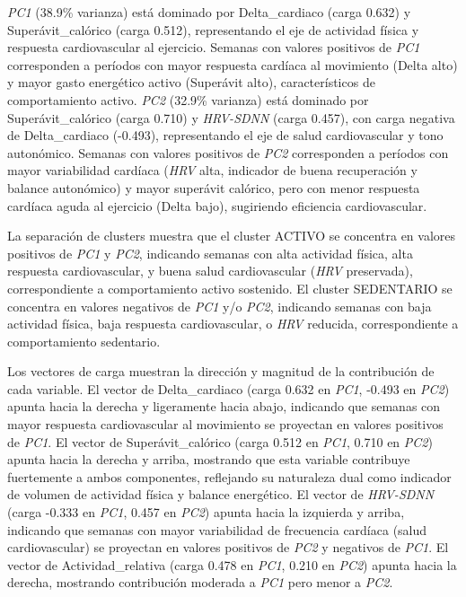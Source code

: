 \textit{PC1} (38.9\% varianza) está dominado por Delta\_cardiaco (carga 0.632) y Superávit\_calórico (carga 0.512), representando el eje de actividad física y respuesta cardiovascular al ejercicio. Semanas con valores positivos de \textit{PC1} corresponden a períodos con mayor respuesta cardíaca al movimiento (Delta alto) y mayor gasto energético activo (Superávit alto), característicos de comportamiento activo. \textit{PC2} (32.9\% varianza) está dominado por Superávit\_calórico (carga 0.710) y \textit{HRV-SDNN} (carga 0.457), con carga negativa de Delta\_cardiaco (-0.493), representando el eje de salud cardiovascular y tono autonómico. Semanas con valores positivos de \textit{PC2} corresponden a períodos con mayor variabilidad cardíaca (\textit{HRV} alta, indicador de buena recuperación y balance autonómico) y mayor superávit calórico, pero con menor respuesta cardíaca aguda al ejercicio (Delta bajo), sugiriendo eficiencia cardiovascular.

La separación de clusters muestra que el cluster ACTIVO se concentra en valores positivos de \textit{PC1} y \textit{PC2}, indicando semanas con alta actividad física, alta respuesta cardiovascular, y buena salud cardiovascular (\textit{HRV} preservada), correspondiente a comportamiento activo sostenido. El cluster SEDENTARIO se concentra en valores negativos de \textit{PC1} y/o \textit{PC2}, indicando semanas con baja actividad física, baja respuesta cardiovascular, o \textit{HRV} reducida, correspondiente a comportamiento sedentario.

Los vectores de carga muestran la dirección y magnitud de la contribución de cada variable. El vector de Delta\_cardiaco (carga 0.632 en \textit{PC1}, -0.493 en \textit{PC2}) apunta hacia la derecha y ligeramente hacia abajo, indicando que semanas con mayor respuesta cardiovascular al movimiento se proyectan en valores positivos de \textit{PC1}. El vector de Superávit\_calórico (carga 0.512 en \textit{PC1}, 0.710 en \textit{PC2}) apunta hacia la derecha y arriba, mostrando que esta variable contribuye fuertemente a ambos componentes, reflejando su naturaleza dual como indicador de volumen de actividad física y balance energético. El vector de \textit{HRV-SDNN} (carga -0.333 en \textit{PC1}, 0.457 en \textit{PC2}) apunta hacia la izquierda y arriba, indicando que semanas con mayor variabilidad de frecuencia cardíaca (salud cardiovascular) se proyectan en valores positivos de \textit{PC2} y negativos de \textit{PC1}. El vector de Actividad\_relativa (carga 0.478 en \textit{PC1}, 0.210 en \textit{PC2}) apunta hacia la derecha, mostrando contribución moderada a \textit{PC1} pero menor a \textit{PC2}.

